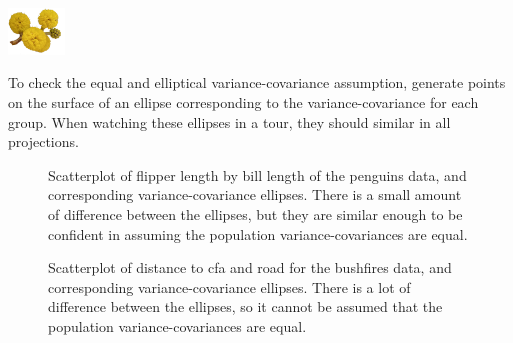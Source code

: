 \documentclass[
  letterpaper,
]{krantz}
\newenvironment{Shaded}{\begin{snugshade}}{\end{snugshade}}
\newcommand{\AttributeTok}[1]{\textcolor[rgb]{0.40,0.45,0.13}{#1}}
\newcommand{\CommentTok}[1]{\textcolor[rgb]{0.37,0.37,0.37}{#1}}
\newcommand{\ConstantTok}[1]{\textcolor[rgb]{0.56,0.35,0.01}{#1}}
\newcommand{\ControlFlowTok}[1]{\textcolor[rgb]{0.00,0.23,0.31}{\textbf{#1}}}
\newcommand{\DecValTok}[1]{\textcolor[rgb]{0.68,0.00,0.00}{#1}}
\newcommand{\FloatTok}[1]{\textcolor[rgb]{0.68,0.00,0.00}{#1}}
\newcommand{\FunctionTok}[1]{\textcolor[rgb]{0.28,0.35,0.67}{#1}}
\newcommand{\NormalTok}[1]{\textcolor[rgb]{0.00,0.23,0.31}{#1}}
\newcommand{\OtherTok}[1]{\textcolor[rgb]{0.00,0.23,0.31}{#1}}
\newcommand{\SpecialCharTok}[1]{\textcolor[rgb]{0.37,0.37,0.37}{#1}}
\newcommand{\infobox}[1]{%
\noindent\colorbox{info!30}{%
\begin{minipage}{0.98\linewidth}%
    \centering%
    \begin{minipage}[c]{0.15\linewidth} %
      \includegraphics[width=1.5cm]{images/mulga-flowers2.png} %
    \end{minipage}%
    \hfill %
    \begin{minipage}[c]{0.8\linewidth} %
      \bigskip%
      \textsf{#1}%
      \bigskip%
    \end{minipage}%
    \hspace*{3mm}%
  \end{minipage}%
}%
}
\begin{document}
\infobox{To check the equal and elliptical variance-covariance assumption, generate points on the surface of an ellipse corresponding to the variance-covariance for each group. When watching these ellipses in a tour, they should similar in all projections.
}

 

\begin{Shaded}
\end{Shaded}

\begin{figure}


\caption{\label{fig-lda-assumptions1}Scatterplot of flipper length by
bill length of the penguins data, and corresponding variance-covariance
ellipses. There is a small amount of difference between the ellipses,
but they are similar enough to be confident in assuming the population
variance-covariances are equal.}

\end{figure}%

\begin{figure}


\caption{\label{fig-lda-assumptions2}Scatterplot of distance to cfa and
road for the bushfires data, and corresponding variance-covariance
ellipses. There is a lot of difference between the ellipses, so it
cannot be assumed that the population variance-covariances are equal.}

\end{figure}%
\end{document}
